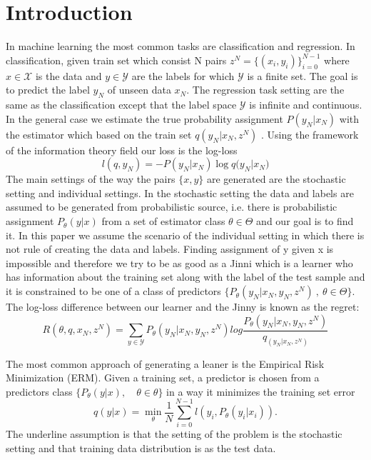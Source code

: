 \documentclass[final,1p,times]{elsarticle}
\begin{document}
\section{Introduction} \label{Introduction}
In machine learning the most common tasks are classification and regression. In classification, given train set which consist N pairs $z^N=\{(x_i, y_i)\}_{i=0}^{N-1}$ where $x \in \mathcal{X}$ is the data and $y \in \mathcal{Y}$ are the labels for which $\mathcal{Y}$ is a finite set. The goal is to predict the label $y_N$ of unseen data $x_N$.  The regression task setting are the same as the classification except that the label space $\mathcal{Y}$ is infinite and continuous.
In the general case we estimate the true probability assignment $P(y_N|x_N)$  with the estimator which based on the train set $q(y_N|x_N, z^N)$ . Using the framework of the information theory field our loss is the log-loss
\begin{equation*}
l(q,y_N) = -P(y_N|x_N)\log {q(y_N|x_N})
\end{equation*}The main settings of the way the pairs $\{x,y\}$ are generated are the stochastic setting and individual settings. In the stochastic setting the data and labels are assumed to be generated from probabilistic source, i.e. there is probabilistic assignment $P_\theta(y|x)$ from a set of estimator class $\theta \in \Theta$ and our goal is to find it. In this paper we assume the scenario of the individual setting in which there is not rule of creating the data and labels. Finding assignment of y given x is impossible and therefore we try to be as good as a Jinni which is a learner who has information about the training set along with the label of the test sample and it is constrained to be one of a class of predictors $\{P_\theta(y_N|x_N,y_N,z^N)\ , \ \theta \in \Theta \}$. The log-loss difference between our learner and the Jinny is known as the regret:
\begin{equation}
    R(\theta, q, x_N, z^N) = \sum_{y \in \mathcal{Y}} P_\theta(y_N|x_N,y_N,z^N) log \frac{P_\theta(y_N|x_N,y_N,z^N)}{q_(y_N|x_N, z^N)} 
\end{equation}

The most common approach of generating a leaner is the Empirical Risk Minimization (ERM). Given a training set, a predictor is chosen from a predictors class $\{P_\theta(y|x) , \quad \theta \in \mathcal{\theta}\}$ in a way it minimizes the training set error 
\begin{equation}
    q(y|x) = \min_\theta \frac{1}{N}\sum_{i=0}^{N-1}  l(y_i,P_\theta(y_i|x_i)).
\end{equation}
The underline assumption is that the setting of the problem is the stochastic setting and that training data distribution is as the test data. 
\end{document}
